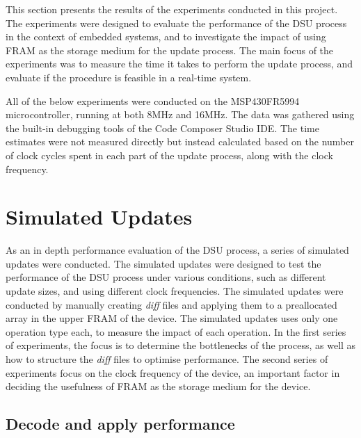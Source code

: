 This section presents the results of the experiments conducted in this project. The experiments were designed to evaluate the performance of the DSU process in the context of embedded systems, and to investigate the impact of using FRAM as the storage medium for the update process. The main focus of the experiments was to measure the time it takes to perform the update process, and evaluate if the procedure is feasible in a real-time system.

All of the below experiments were conducted on the MSP430FR5994 microcontroller, running at both 8MHz and 16MHz. The data was gathered using the built-in debugging tools of the Code Composer Studio IDE. The time estimates were not measured directly but instead calculated based on the number of clock cycles spent in each part of the update process, along with the clock frequency. 

\section{Simulated Updates}
As an in depth performance evaluation of the DSU process, a series of simulated updates were conducted. The simulated updates were designed to test the performance of the DSU process under various conditions, such as different update sizes, and using different clock frequencies. The simulated updates were conducted by manually creating \textit{diff} files and applying them to a preallocated array in the upper FRAM of the device. The simulated updates uses only one operation type each, to measure the impact of each operation. In the first series of experiments, the focus is to determine the bottlenecks of the process, as well as how to structure the \textit{diff} files to optimise performance. The second series of experiments focus on the clock frequency of the device, an important factor in deciding the usefulness of FRAM as the storage medium for the device.
\subsection{Decode and apply performance}

